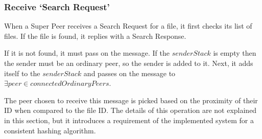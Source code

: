 \subsubsection{Receive `Search Request'}


When a Super Peer receives a Search Request for a file, it first checks its list
of files. If the file is found, it replies with a Search Response. 

If it is not found, it must pass on the message. If the $senderStack$ is empty
then the sender must be an ordinary peer, so the sender is added to it.  Next,
it adds itself to the $senderStack$ and passes on the message to $\exists peer
\in connectedOrdinaryPeers$.

The peer chosen to receive this message is picked based on the proximity of
their ID when compared to the file ID.  The details of this operation are not
explained in this section, but it introduces a requirement of the implemented
system for a consistent hashing algorithm.

\begin{algorithm}[H]


\end{algorithm}







